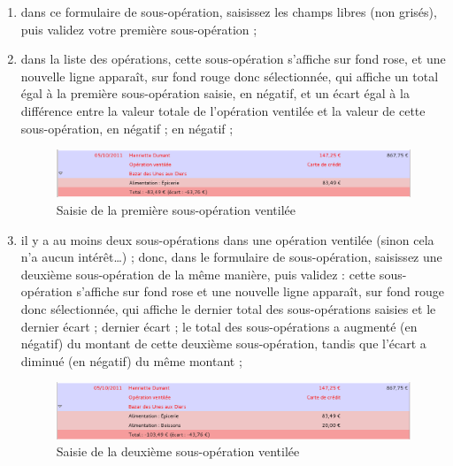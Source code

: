 \begin{enumerate}
	 \item dans ce formulaire de sous-opération, saisissez les champs libres (non grisés), puis validez votre première sous-opération ;
	 \item dans la liste des opérations, cette sous-opération s'affiche sur fond rose{\couleur}, et une nouvelle ligne apparaît, sur fond rouge{\couleur} donc sélectionnée, qui affiche un total égal à la première sous-opération saisie, en négatif, et un écart égal à la différence entre la valeur totale de l'opération ventilée et la valeur de cette sous-opération, \ifIllustration en négatif ;
	\else en négatif ;
	\fi
	
	\ifIllustration
	\begin{figure}[htp]
	\begin{center}
	\includegraphics[scale=0.5]{image/screenshot/transactions_breakdown_sub1}
	\end{center}
	\caption{Saisie de la première sous-opération ventilée}
	\label{transactions-breakdown-sub1-img}
	\end{figure}
	\fi

	 \item il y a au moins deux sous-opérations dans une opération ventilée (sinon cela n'a aucun intérêt\ldots) ; donc, dans le formulaire de sous-opération, saisissez une deuxième sous-opération de la même manière, puis validez : cette sous-opération s'affiche sur fond rose{\couleur} et une nouvelle ligne apparaît, sur fond rouge{\couleur} donc sélectionnée, qui affiche le dernier total des sous-opérations saisies et le \ifIllustration dernier écart  ;
	\else dernier écart ;
	\fi
	le total des sous-opérations a augmenté (en négatif) du montant de cette deuxième sous-opération, tandis que l'écart a diminué (en négatif) du même montant ; 

	\ifIllustration
	\begin{figure}[htp]
	\begin{center}
	\includegraphics[scale=0.5]{image/screenshot/transactions_breakdown_sub2}
	\end{center}
	\caption{Saisie de la deuxième sous-opération ventilée}
	\label{transactions-breakdown-sub2-img}
	\end{figure}
	\fi


\end{enumerate}
